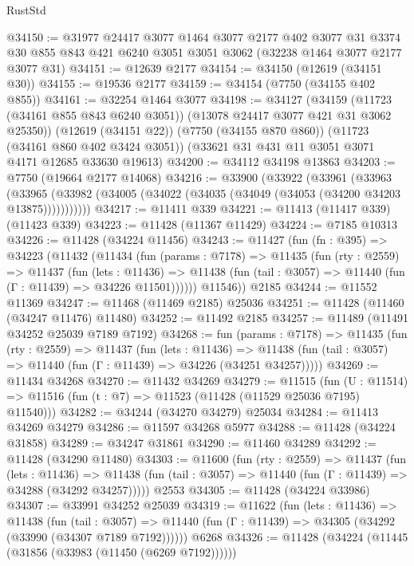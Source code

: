 \begin{lexlean}{RustStd}
\begin{coremodule}
@34150 := @31977
    @24417
    @3077
    @1464
    @3077
    @2177
    @402
    @3077
    @31
    @3374
    @30
    @855
    @843
    @421
    @6240
    @3051
    @3051
    @3062
    (@32238 @1464 @3077 @2177 @3077 @31)
@34151 := @12639 @2177
@34154 := @34150 (@12619 (@34151 @30))
@34155 := @19536 @2177
@34159 := @34154 (@7750 (@34155 @402 @855))
@34161 := @32254 @1464 @3077
@34198 := @34127
    (@34159 (@11723 (@34161 @855 @843 @6240 @3051)) (@13078 @24417 @3077 @421 @31 @3062 @25350))
    (@12619 (@34151 @22))
    (@7750 (@34155 @870 @860))
    (@11723 (@34161 @860 @402 @3424 @3051))
    (@33621 @31 @431 @11 @3051 @3071 @4171 @12685 @33630 @19613)
@34200 := @34112 @34198 @13863
@34203 := @7750 (@19664 @2177 @14068)
@34216 := @33900
    (@33922
      (@33961
        (@33963
          (@33965 (@33982 (@34005 (@34022 (@34035 (@34049 (@34053 (@34200 @34203 @13875)))))))))))
@34217 := @11411 @339
@34221 := @11413 (@11417 @339) (@11423 @339)
@34223 := @11428 (@11367 @11429)
@34224 := @7185 @10313
@34226 := @11428 (@34224 @11456)
@34243 := @11427
    (fun (fn : @395) =>
    @34223
      (@11432
        (@11434
          (fun (params : @7178) =>
          @11435
            (fun (rty : @2559) =>
            @11437
              (fun (lets : @11436) =>
              @11438 (fun (tail : @3057) => @11440 (fun (Γ : @11439) => @34226 @11501))))))
        @11546))
    @2185
@34244 := @11552 @11369
@34247 := @11468 (@11469 @2185) @25036
@34251 := @11428 (@11460 (@34247 @11476) @11480)
@34252 := @11492 @2185
@34257 := @11489 (@11491 @34252 @25039 @7189 @7192)
@34268 := fun (params : @7178) =>
  @11435
    (fun (rty : @2559) =>
    @11437
      (fun (lets : @11436) =>
      @11438 (fun (tail : @3057) => @11440 (fun (Γ : @11439) => @34226 (@34251 @34257)))))
@34269 := @11434 @34268
@34270 := @11432 @34269
@34279 := @11515
    (fun (U : @11514) => @11516 (fun (t : @7) => @11523 (@11428 (@11529 @25036 @7195) @11540)))
@34282 := @34244 (@34270 @34279) @25034
@34284 := @11413 @34269 @34279
@34286 := @11597 @34268 @5977
@34288 := @11428 (@34224 @31858)
@34289 := @34247 @31861
@34290 := @11460 @34289
@34292 := @11428 (@34290 @11480)
@34303 := @11600
    (fun (rty : @2559) =>
    @11437
      (fun (lets : @11436) =>
      @11438 (fun (tail : @3057) => @11440 (fun (Γ : @11439) => @34288 (@34292 @34257)))))
    @2553
@34305 := @11428 (@34224 @33986)
@34307 := @33991 @34252 @25039
@34319 := @11622
    (fun (lets : @11436) =>
    @11438
      (fun (tail : @3057) =>
      @11440 (fun (Γ : @11439) => @34305 (@34292 (@33990 (@34307 @7189 @7192))))))
    @6268
@34326 := @11428 (@34224 (@11445 (@31856 (@33983 (@11450 (@6269 @7192))))))

\end{coremodule}
\end{lexlean}

